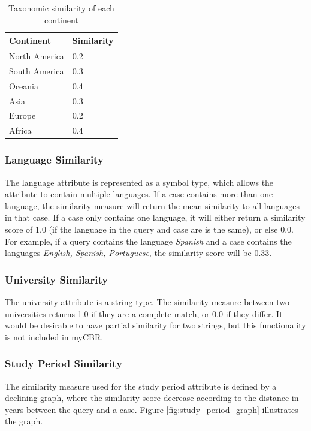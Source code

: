 \begin{table}[h]
\centering
\caption{Taxonomic similarity of each continent}
\label{tab:taxonomic_continent_similarity}
\begin{tabulary}{\textwidth}{|L|L|}
\hline
\textbf{Continent} & \textbf{Similarity} \\ \hline \hline
North America & 0.2 \\ \hline
South America & 0.3 \\ \hline
Oceania & 0.4 \\ \hline
Asia & 0.3 \\ \hline
Europe & 0.2 \\ \hline
Africa & 0.4 \\ \hline
\end{tabulary}
\end{table}
    
\subsubsection{Language Similarity} 

The language attribute is represented as a symbol type, which allows the attribute to contain multiple languages. If a case contains more than one language, the similarity measure will return the mean similarity to all languages in that case. If a case only contains one language, it will either return a similarity score of 1.0 (if the language in the query and case are is the same), or else 0.0. For example, if a query contains the language \textit{Spanish} and a case contains the languages \textit{English, Spanish, Portuguese}, the similarity score will be 0.33.
    
\subsubsection{University Similarity} 

The university attribute is a string type. The similarity measure between two universities returns 1.0 if they are a complete match, or 0.0 if they differ. It would be desirable to have partial similarity for two strings, but this functionality is not included in myCBR.
    
\subsubsection{Study Period Similarity} 

The similarity measure used for the study period attribute is defined by a declining graph, where the similarity score decrease according to the distance in years between the query and a case. Figure \ref{fig:study_period_graph} illustrates the graph.
    

